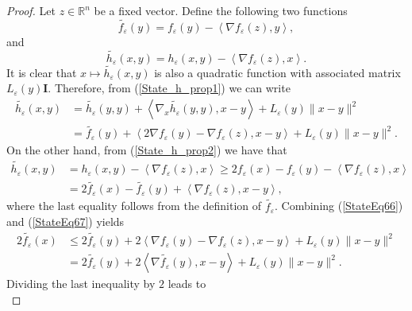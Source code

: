 \documentclass[11pt]{article}
\numberwithin{equation}{section}
\begin{document}
\begin{proof}
Let $z \in \mathbb{R}^n$ be a fixed vector. Define the following two functions
\begin{equation*}
	\widetilde{f_{\varepsilon}}(y) = f_{\varepsilon}(y) - \left\langle \nabla f_{\varepsilon}(z), y \right\rangle ,
\end{equation*}
and 
 \begin{equation*}
	\widetilde{h_{\varepsilon}}(x,y) = h_{\varepsilon}(x,y) - \left\langle \nabla f_{\varepsilon}(z), x \right\rangle .
\end{equation*}
It is clear that $x \mapsto \widetilde{h_{\varepsilon}}(x,y)$ is also a quadratic function with associated matrix $L_{\varepsilon}(y)\mathbf{I}$. Therefore, from (\ref{State_h_prop1}) we can write
\begin{align}
	\widetilde{h_{\varepsilon}}(x,y) &= \widetilde{h_{\varepsilon}}(y,y) + \left\langle \nabla_x \widetilde{h_{\varepsilon}}(y,y), x-y \right\rangle + L_{\varepsilon}(y) \|x-y\|^2 \\
	&= \widetilde{f_{\varepsilon}}(y) + \left\langle 2\nabla f_{\varepsilon}(y) - \nabla f_{\varepsilon}(z), x-y \right\rangle + L_{\varepsilon}(y) \|x-y\|^2.	\label{StateEq66}
\end{align}
On the other hand, from (\ref{State_h_prop2}) we have that
\begin{align}
	\widetilde{h_{\varepsilon}}(x,y) &= h_{\varepsilon}(x,y) - \left\langle	\nabla f_{\varepsilon}(z),x \right\rangle \geq 2f_{\varepsilon}(x) - f_{\varepsilon}(y) - \left\langle \nabla f_{\varepsilon}(z),x \right\rangle \\
	&= 2 \widetilde{f_{\varepsilon}}(x) - \widetilde{f_{\varepsilon}}(y) + \left\langle \nabla f_{\varepsilon}(z), x-y \right\rangle, \label{StateEq67}
\end{align}
where the last equality follows from the definition of $\widetilde{f_{\varepsilon}}$. Combining (\ref{StateEq66}) and (\ref{StateEq67}) yields
\begin{align*}
	2\widetilde{f_{\varepsilon}}(x) &\leq 2\widetilde{f_{\varepsilon}}(y) + 2 \left\langle \nabla f_{\varepsilon}(y) - \nabla f_{\varepsilon}(z), x-y \right\rangle + L_{\varepsilon}(y) \|x-y\|^2 \\
	&= 2\widetilde{f_{\varepsilon}}(y) + 2 \left\langle \nabla \widetilde{f_{\varepsilon}}(y), x-y \right\rangle + L_{\varepsilon}(y) \|x-y\|^2.
\end{align*}
Dividing the last inequality by $2$ leads to
\begin{equation}

\end{equation}
\end{proof}
\end{document}
